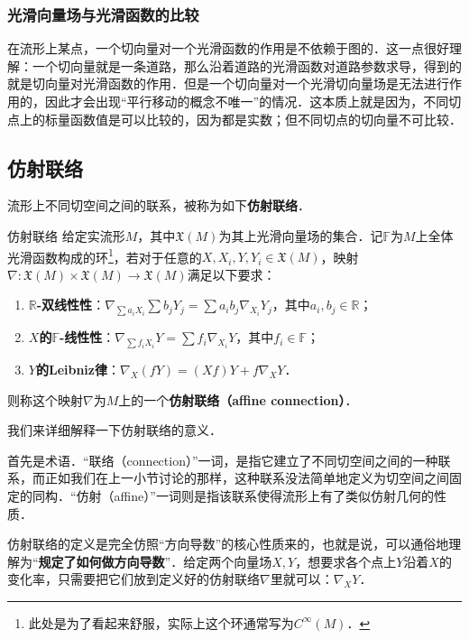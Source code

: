 \subsubsection{光滑向量场与光滑函数的比较}

在流形上某点，一个切向量对一个光滑函数的作用是不依赖于图的．这一点很好理解：一个切向量就是一条道路，那么沿着道路的光滑函数对道路参数求导，得到的就是切向量对光滑函数的作用．但是一个切向量对一个光滑切向量场是无法进行作用的，因此才会出现“平行移动的概念不唯一”的情况．这本质上就是因为，不同切点上的标量函数值是可以比较的，因为都是实数；但不同切点的切向量不可比较．


\subsection{仿射联络}

流形上不同切空间之间的联系，被称为如下\textbf{仿射联络}．

\begin{definition}{仿射联络}
给定实流形$M$，其中$\mathfrak{X}(M)$为其上光滑向量场的集合．记$\mathbb{F}$为$M$上全体光滑函数构成的环\footnote{此处是为了看起来舒服，实际上这个环通常写为$C^\infty(M)$．}，若对于任意的$X, X_i, Y, Y_i\in\mathfrak{X}(M)$，映射$\nabla:\mathfrak{X}(M)\times\mathfrak{X}(M)\to\mathfrak{X}(M)$满足以下要求：
\begin{enumerate}
\item \textbf{$\mathbb{R}$-双线性性}：$\nabla_{\sum a_iX_i}\sum b_jY_j=\sum a_ib_j\nabla_{X_i}Y_j$，其中$a_i, b_j\in\mathbb{R}$；
\item \textbf{$X$的$\mathbb{F}$-线性性}：$\nabla_{\sum f_iX_i}Y=\sum f_i\nabla_{X_i}Y$，其中$f_i\in\mathbb{F}$；
\item \textbf{$Y$的Leibniz律}：$\nabla_X(fY)=(Xf)Y+f\nabla_XY$．
\end{enumerate}
则称这个映射$\nabla$为$M$上的一个\textbf{仿射联络（affine connection）}．
\end{definition}

我们来详细解释一下仿射联络的意义．

首先是术语．“联络（connection）”一词，是指它建立了不同切空间之间的一种联系，而正如我们在上一小节讨论的那样，这种联系没法简单地定义为切空间之间固定的同构．“仿射（affine）”一词则是指该联系使得流形上有了类似仿射几何的性质．

仿射联络的定义是完全仿照“方向导数”的核心性质来的，也就是说，可以通俗地理解为“\textbf{规定了如何做方向导数}”．给定两个向量场$X, Y$，想要求各个点上$Y$沿着$X$的变化率，只需要把它们放到定义好的仿射联络$\nabla$里就可以：$\nabla_XY$．

